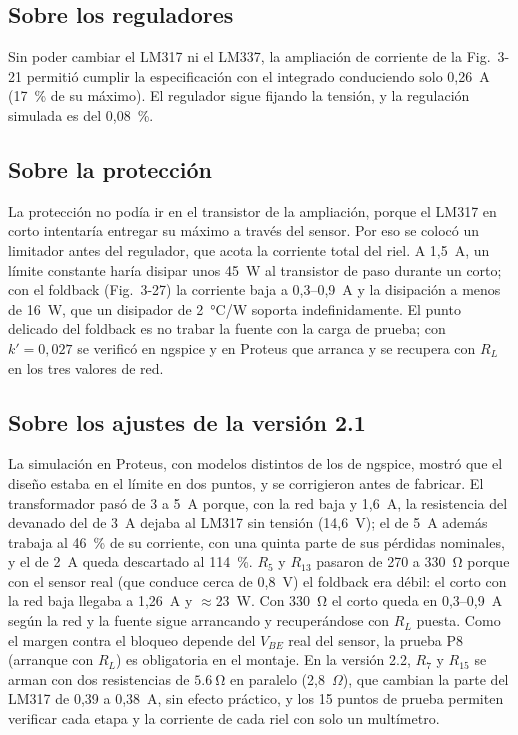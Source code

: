 \documentclass[conference]{IEEEtran}
\begin{document}
\subsection{Sobre los reguladores}
Sin poder cambiar el LM317 ni el LM337, la ampliación de corriente de la Fig.~3-21 permitió cumplir la especificación con el integrado conduciendo solo 0,26~A (17~\% de su máximo). El regulador sigue fijando la tensión, y la regulación simulada es del 0,08~\%.

\subsection{Sobre la protección}
La protección no podía ir en el transistor de la ampliación, porque el LM317 en corto intentaría entregar su máximo a través del sensor. Por eso se colocó un limitador antes del regulador, que acota la corriente total del riel. A 1,5~A, un límite constante haría disipar unos 45~W al transistor de paso durante un corto; con el foldback (Fig.~3-27) la corriente baja a 0,3--0,9~A y la disipación a menos de 16~W, que un disipador de 2~°C/W soporta indefinidamente. El punto delicado del foldback es no trabar la fuente con la carga de prueba; con $k'=0{,}027$ se verificó en ngspice y en Proteus que arranca y se recupera con $R_L$ en los tres valores de red.

\subsection{Sobre los ajustes de la versión 2.1}
La simulación en Proteus, con modelos distintos de los de ngspice, mostró que el diseño estaba en el límite en dos puntos, y se corrigieron antes de fabricar. El transformador pasó de 3 a 5~A porque, con la red baja y 1,6~A, la resistencia del devanado del de 3~A dejaba al LM317 sin tensión (14,6~V); el de 5~A además trabaja al 46~\% de su corriente, con una quinta parte de sus pérdidas nominales, y el de 2~A queda descartado al 114~\%. $R_5$ y $R_{13}$ pasaron de 270 a \SI{330}{\ohm} porque con el sensor real (que conduce cerca de 0,8~V) el foldback era débil: el corto con la red baja llegaba a 1,26~A y $\approx$23~W. Con \SI{330}{\ohm} el corto queda en 0,3--0,9~A según la red y la fuente sigue arrancando y recuperándose con $R_L$ puesta. Como el margen contra el bloqueo depende del $V_{BE}$ real del sensor, la prueba P8 (arranque con $R_L$) es obligatoria en el montaje. En la versión 2.2, $R_7$ y $R_{15}$ se arman con dos resistencias de $\SI{5,6}{\ohm}$ en paralelo (2,8~$\Omega$), que cambian la parte del LM317 de 0,39 a 0,38~A, sin efecto práctico, y los 15 puntos de prueba permiten verificar cada etapa y la corriente de cada riel con solo un multímetro.
\end{document}
